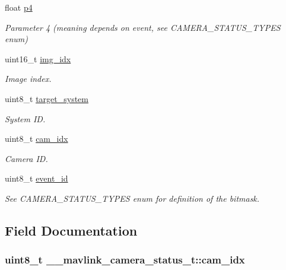 \begin{DoxyCompactItemize}
float \hyperlink{struct____mavlink__camera__status__t_a98d593c668bd59529d4d8bc6ed8697d9}{p4}
\begin{DoxyCompactList}\small\item\em Parameter 4 (meaning depends on event, see C\+A\+M\+E\+R\+A\+\_\+\+S\+T\+A\+T\+U\+S\+\_\+\+T\+Y\+P\+E\+S enum) \end{DoxyCompactList}\item 
uint16\+\_\+t \hyperlink{struct____mavlink__camera__status__t_a7833bdc7c05f95ad25ad03c5a4721bb7}{img\+\_\+idx}
\begin{DoxyCompactList}\small\item\em Image index. \end{DoxyCompactList}\item 
uint8\+\_\+t \hyperlink{struct____mavlink__camera__status__t_a3886bbba5cff1758e5da10c463aeb391}{target\+\_\+system}
\begin{DoxyCompactList}\small\item\em System I\+D. \end{DoxyCompactList}\item 
uint8\+\_\+t \hyperlink{struct____mavlink__camera__status__t_a76aa5b2c6f3c71e709202e7533b6ec4e}{cam\+\_\+idx}
\begin{DoxyCompactList}\small\item\em Camera I\+D. \end{DoxyCompactList}\item 
uint8\+\_\+t \hyperlink{struct____mavlink__camera__status__t_a21082504252f369243898d1f39579f84}{event\+\_\+id}
\begin{DoxyCompactList}\small\item\em See C\+A\+M\+E\+R\+A\+\_\+\+S\+T\+A\+T\+U\+S\+\_\+\+T\+Y\+P\+E\+S enum for definition of the bitmask. \end{DoxyCompactList}\end{DoxyCompactItemize}


\subsection{Field Documentation}
\hypertarget{struct____mavlink__camera__status__t_a76aa5b2c6f3c71e709202e7533b6ec4e}{
\subsubsection[{cam\+\_\+idx}]{\setlength{\rightskip}{0pt plus 5cm}uint8\+\_\+t \+\_\+\+\_\+mavlink\+\_\+camera\+\_\+status\+\_\+t\+::cam\+\_\+idx}}\label{struct____mavlink__camera__status__t_a76aa5b2c6f3c71e709202e7533b6ec4e}


